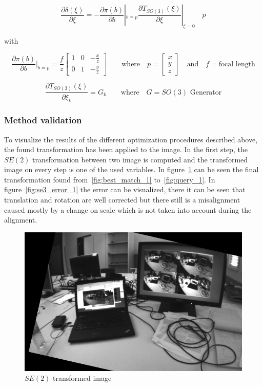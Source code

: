 \begin{equation}
  \frac{\partial \delta(\xi)}{\partial \xi} = -\frac{\partial \pi (b)}{\partial b}|_{b=p} \frac{\partial T_{SO(3)}(\xi)}{\partial\xi}|_{\xi=0} \quad p
\end{equation}

with

\begin{equation}
  \frac{\partial \pi(b)}{\partial b} |_{b=p} = \frac{f}{z}
  \begin{bmatrix}
    1 & 0 & -\frac{x}{z} \\
    0 & 1 & -\frac{y}{z}
  \end{bmatrix}
  \qquad \text{where} \quad 
  p = \begin{bmatrix} x \\ y \\ z \end{bmatrix} \quad \text{and} \quad f = \text{focal length}
\end{equation}

\begin{equation}
  \frac{\partial T_{SO(3)}(\xi)}{\partial \xi_k}  = G_k \qquad \text{where} \quad G = \text{$SO(3)$ Generator}
\end{equation}


\subsubsection{Method validation}
\label{ssub:esm_method_validation}

To visualize the results of the different optimization procedures described above, the found transformation has been applied to the image. In the first step, the $SE(2)$ transformation between two image is computed and the transformed image on every step is one of the used variables. In figure~\ref{fig:se2_transformation_1} can be seen the final transformation found from~\ref{fig:best_match_1} to~\ref{fig:query_1}. In figure~\ref{fig:se3_error_1} the error can be visualized, there it can be seen that translation and rotation are well corrected but there still is a misalignment caused mostly by a change on scale which is not taken into account during the alignment.\\

\begin{figure}[htpb]
  \centering
  \includegraphics[width=0.6\linewidth]{img/se2_transformation_1.png}
  \caption{$SE(2)$ transformed image}
  \label{fig:se2_transformation_1}
\end{figure}

